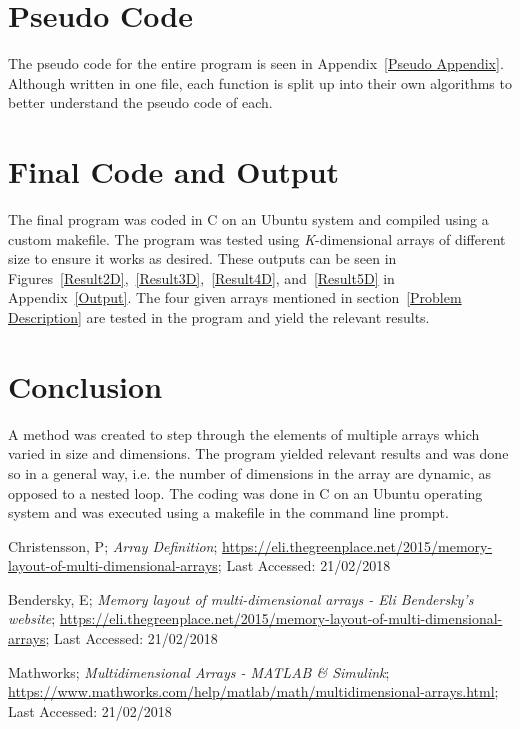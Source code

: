 \documentclass[10pt, conference]{IEEEtran}
\begin{document}
\section{Pseudo Code}
\label{Pseudo Code}
The pseudo code for the entire program is seen in Appendix~\ref{Pseudo Appendix}. Although written in one file, each function is split up into their own algorithms to better understand the pseudo code of each.

\section{Final Code and Output}
\label{Final Code and Output}
The final program was coded in C on an Ubuntu system and compiled using a custom makefile. The program was tested using \emph{K}-dimensional arrays of different size to ensure it works as desired. These outputs can be seen in Figures~\ref{Result2D},~\ref{Result3D},~\ref{Result4D}, and~\ref{Result5D} in Appendix~\ref{Output}. The four given arrays mentioned in section~\ref{Problem Description} are tested in the program and yield the relevant results.


\section{Conclusion}
\label{Conclusion}
A method was created to step through the elements of multiple arrays which varied in size and dimensions. The program yielded relevant results and was done so in a general way, i.e. the number of dimensions in the array are dynamic, as opposed to a nested loop. The coding was done in C on an Ubuntu operating system and was executed using a makefile in the command line prompt.


\begin{thebibliography}{}

Christensson, P; \emph{Array Definition}; \url{https://eli.thegreenplace.net/2015/memory-layout-of-multi-dimensional-arrays}; Last Accessed: 21/02/2018

Bendersky, E; \emph{Memory layout of multi-dimensional arrays - Eli Bendersky's website}; \url{https://eli.thegreenplace.net/2015/memory-layout-of-multi-dimensional-arrays}; Last Accessed: 21/02/2018

Mathworks; \emph{Multidimensional Arrays - MATLAB \& Simulink}; \url{https://www.mathworks.com/help/matlab/math/multidimensional-arrays.html}; Last Accessed: 21/02/2018

\end{thebibliography}
\end{document}
